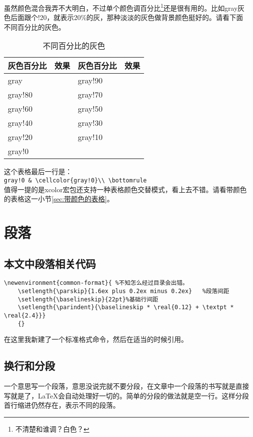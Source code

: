 虽然颜色混合我弄不大明白，不过单个颜色调百分比\footnote{不清楚和谁调？白色？}还是很有用的。比如gray灰色后面跟个!20，就表示20\%的灰，那种淡淡的灰色做背景颜色挺好的。请看下面不同百分比的灰色。
\begin{table}[h]
\begin{tabular}{@{}lp{50pt}lp{50pt}@{}}
\toprule
灰色百分比        & 效果  & 灰色百分比       & 效果\\ \midrule
gray     &  \cellcolor{gray}  & gray!90     &    \cellcolor{gray!90} \\
gray!80      &   \cellcolor{gray!80} & gray!70    &   \cellcolor{gray!70}\\
gray!60     &  \cellcolor{gray!60}  & gray!50      &   \cellcolor{gray!50}\\
gray!40      &   \cellcolor{gray!40} & gray!30    &   \cellcolor{gray!30}\\
gray!20  &  \cellcolor{gray!20} &gray!10       &   \cellcolor{gray!10}  \\
gray!0    &    \cellcolor{gray!0}\\ \bottomrule
\end{tabular}
\label{tab:不同百分比的灰色}
\caption{不同百分比的灰色}
\end{table}
这个表格最后一行是：\\
\verb+gray!0 & \cellcolor{gray!0}\\ \bottomrule+\\

值得一提的是xcolor宏包还支持一种表格颜色交替模式，看上去不错。请看带颜色的表格这一小节\ref{sec:带颜色的表格}。


\section{段落}
\subsection{本文中段落相关代码}
\begin{verbatim}
\newenvironment{common-format}{ %不知怎么经过目录会出错。
	\setlength{\parskip}{1.6ex plus 0.2ex minus 0.2ex}   %段落间距
	\setlength{\baselineskip}{22pt}%基础行间距
	\setlength{\parindent}{\baselineskip * \real{0.12} + \textpt * \real{2.4}}}  
    {}
\end{verbatim}
在这里我新建了一个标准格式命令，然后在适当的时候引用。

\subsection{换行和分段}
一个意思写一个段落，意思没说完就不要分段，在文章中一个段落的书写就是直接写就是了，\LaTeX 会自动处理好一切的。简单的分段的做法就是空一行。这样分段首行缩进仍然存在，表示不同的段落。

